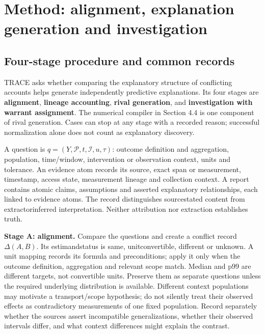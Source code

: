 \documentclass[11pt,a4paper]{article}
\newcommand{\CNSIdentifier}[1]{{\small\ttfamily\def\_{\textunderscore\allowbreak}#1}}
\begin{document}
\section{Method: alignment, explanation generation and
investigation}\label{method-alignment-explanation-generation-and-investigation}

\subsection{Four-stage procedure and common
records}\label{four-stage-procedure-and-common-records}

TRACE asks whether comparing the explanatory structure of conflicting
accounts helps generate independently predictive explanations. Its four
stages are \textbf{alignment}, \textbf{lineage accounting},
\textbf{rival generation}, and \textbf{investigation with warrant
assignment}. The numerical compiler in Section 4.4 is one component of
rival generation. Cases can stop at any stage with a recorded reason;
successful normalization alone does not count as explanatory discovery.

A question is \(q=(Y,\mathcal P,t,\mathcal I,u,\tau)\): outcome
definition and aggregation, population, time/window, intervention or
observation context, units and tolerance. An evidence atom records its
source, exact span or measurement, timestamp, access state, measurement
lineage and collection context. A report contains atomic claims,
assumptions and asserted explanatory relationships, each linked to
evidence atoms. The record distinguishes \CNSIdentifier{source\_stated} content
from \CNSIdentifier{extractor\_inferred} interpretation. Neither attribution
nor extraction establishes truth.

\textbf{Stage A: alignment.} Compare the questions and create a conflict
record \(\Delta(A,B)\). Its \CNSIdentifier{estimand\_status} is \CNSIdentifier{same},
\CNSIdentifier{unit\_convertible}, \CNSIdentifier{different} or \CNSIdentifier{unknown}. A
unit mapping records its formula and preconditions; apply it only when
the outcome definition, aggregation and relevant scope match. Median and
p99 are different targets, not convertible units. Preserve them as
separate questions unless the required underlying distribution is
available. Different context populations may motivate a transport/scope
hypothesis; do not silently treat their observed effects as
contradictory measurements of one fixed population. Record separately
whether the sources assert incompatible generalizations, whether their
observed intervals differ, and what context differences might explain
the contrast.
\end{document}
